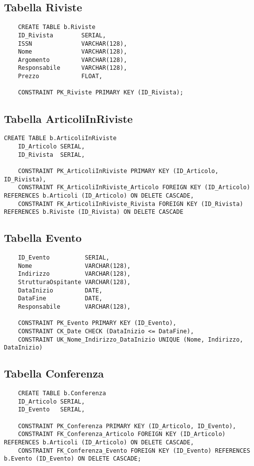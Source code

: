 \subsection{Tabella Riviste}
\begin{lstlisting}
    CREATE TABLE b.Riviste
    ID_Rivista        SERIAL,
    ISSN              VARCHAR(128),
    Nome              VARCHAR(128),
    Argomento         VARCHAR(128),
    Responsabile      VARCHAR(128),
    Prezzo            FLOAT,

    CONSTRAINT PK_Riviste PRIMARY KEY (ID_Rivista);
\end{lstlisting}

\subsection{Tabella ArticoliInRiviste}
\begin{lstlisting}
CREATE TABLE b.ArticoliInRiviste
    ID_Articolo SERIAL,
    ID_Rivista  SERIAL,

    CONSTRAINT PK_ArticoliInRiviste PRIMARY KEY (ID_Articolo, ID_Rivista),
    CONSTRAINT FK_ArticoliInRiviste_Articolo FOREIGN KEY (ID_Articolo) REFERENCES b.Articoli (ID_Articolo) ON DELETE CASCADE,
    CONSTRAINT FK_ArticoliInRiviste_Rivista FOREIGN KEY (ID_Rivista) REFERENCES b.Riviste (ID_Rivista) ON DELETE CASCADE
\end{lstlisting}

\newpage

\subsection{Tabella Evento}
\begin{lstlisting}
    ID_Evento          SERIAL,
    Nome               VARCHAR(128),
    Indirizzo          VARCHAR(128),
    StrutturaOspitante VARCHAR(128),
    DataInizio         DATE,
    DataFine           DATE,
    Responsabile       VARCHAR(128),

    CONSTRAINT PK_Evento PRIMARY KEY (ID_Evento),
    CONSTRAINT CK_Date CHECK (DataInizio <= DataFine),
    CONSTRAINT UK_Nome_Indirizzo_DataInizio UNIQUE (Nome, Indirizzo, DataInizio)
\end{lstlisting}

\subsection{Tabella Conferenza}
\begin{lstlisting}
    CREATE TABLE b.Conferenza
    ID_Articolo SERIAL,
    ID_Evento   SERIAL,

    CONSTRAINT PK_Conferenza PRIMARY KEY (ID_Articolo, ID_Evento),
    CONSTRAINT FK_Conferenza_Articolo FOREIGN KEY (ID_Articolo) REFERENCES b.Articoli (ID_Articolo) ON DELETE CASCADE,
    CONSTRAINT FK_Conferenza_Evento FOREIGN KEY (ID_Evento) REFERENCES b.Evento (ID_Evento) ON DELETE CASCADE;
\end{lstlisting}

